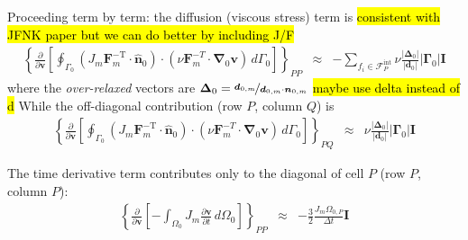 \documentclass[sn-mathphys,Numbered]{sn-jnl}%
\newcommand{\bb}{\boldsymbol}
\begin{document}
Proceeding term by term: the diffusion (viscous stress) term is \hl{consistent with JFNK paper but we can do better by including J/F}
\begin{eqnarray}
    	\left\{
	\frac{\partial}{\partial \bb{v}}
	\left[
	\oint_{\Gamma_0}  \left( J_m \bb{F}_m^{-\text{T}} \cdot \hat{\bb{n}}_0 \right)
		\cdot \left(\nu \bb{F}_m^{-T} \cdot \bb{\nabla}_0 \bb{v} \right) \, d\Gamma_0
	\right]
	\right\}_{PP}
	&\approx&
	- \sum_{f_i \in \mathcal{F}^{\text{int}}_P}  \nu
	\frac{ \left|\bb{\Delta}_0 \right| }{\left|\bb{d}_0 \right|}  \left|\bb{\Gamma}_0 \right| \textbf{I}
\end{eqnarray}
where the \emph{over-relaxed} vectors are $\bb{\Delta}_0 = \nicefrac{\bb{d}_{0,m}}{\bb{d}_{0,m} \cdot \bb{n}_{0,m}}$ \hl{maybe use delta instead of d}
While the off-diagonal contribution (row $P$, column $Q$) is
\begin{eqnarray}
    	\left\{
	\frac{\partial}{\partial \bb{v}}
	\left[
	\oint_{\Gamma_0}  \left( J_m \bb{F}_m^{-\text{T}} \cdot \hat{\bb{n}}_0 \right)
		\cdot \left(\nu \bb{F}_m^{-T} \cdot \bb{\nabla}_0 \bb{v} \right) \, d\Gamma_0
	\right]
	\right\}_{PQ}
	&\approx& \nu \frac{ \left|\bb{\Delta}_0 \right| }{\left|\bb{d}_0 \right|}  \left|\bb{\Gamma}_0 \right| \textbf{I}
\end{eqnarray}


The time derivative term contributes only to the diagonal of cell $P$ (row $P$, column $P$):
\begin{eqnarray}
	\left\{
    	\frac{\partial}{\partial \bb{v}}
	\left[
	- \int_{\Omega_0} J_m \frac{\partial \bb{v}}{\partial t} \, d\Omega_0 
	\right]
	\right\}_{PP}
	&\approx& - \frac{3}{2} \frac{J_m \Omega_{0,P}}{\Delta t} \textbf{I}
\end{eqnarray}
\end{document}
